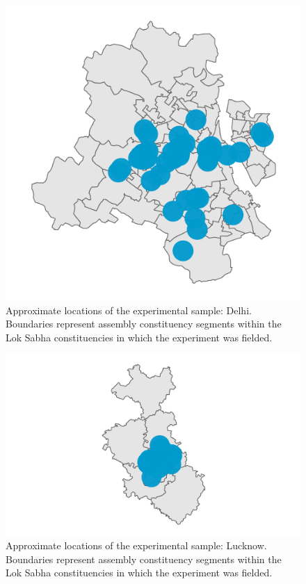 \documentclass[
  11.5pt,
]{article}
\begin{document}
\begin{figure}

{\centering \includegraphics[width=0.5\linewidth]{pic-del-map} 

}

\caption{Approximate locations of the experimental sample: Delhi. Boundaries represent assembly constituency segments within the Lok Sabha constituencies in which the experiment was fielded.}\label{fig:unnamed-chunk-66}
\end{figure}

\clearpage

\begin{figure}

{\centering \includegraphics[width=0.8\linewidth]{pic-luc-map} 

}

\caption{Approximate locations of the experimental sample: Lucknow. Boundaries represent assembly constituency segments within the Lok Sabha constituencies in which the experiment was fielded.}\label{fig:unnamed-chunk-67}
\end{figure}
\end{document}
